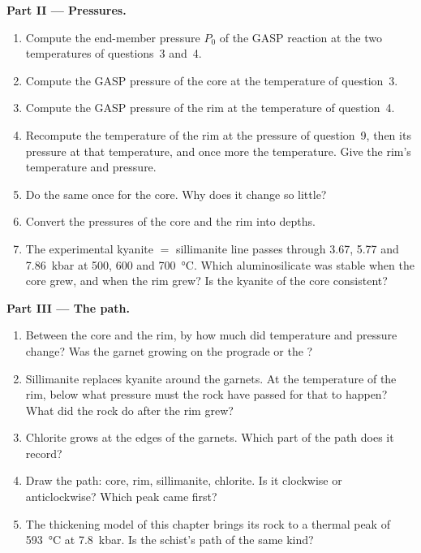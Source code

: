 \begin{problem}
\noindent\textbf{Part II --- Pressures.}
\begin{enumerate}[resume]
\item Compute the end-member pressure $P_0$ of the GASP reaction at the two temperatures
of questions~3 and~4.
\item Compute the GASP pressure of the core at the temperature of question~3.
\item Compute the GASP pressure of the rim at the temperature of question~4.
\item Recompute the temperature of the rim at the pressure of question~9, then its
pressure at that temperature, and once more the temperature. Give the rim's temperature
and pressure.
\item Do the same once for the core. Why does it change so little?
\item Convert the pressures of the core and the rim into depths.
\item The experimental kyanite $=$ sillimanite line passes through 3.67, 5.77 and
\qty{7.86}{kbar} at 500, 600 and \qty{700}{\celsius}. Which aluminosilicate was stable
when the core grew, and when the rim grew? Is the kyanite of the core consistent?
\end{enumerate}

\noindent\textbf{Part III --- The path.}
\begin{enumerate}[resume]
\item Between the core and the rim, by how much did temperature and pressure change?
Was the garnet growing on the prograde or the ?
\item Sillimanite replaces kyanite around the garnets. At the temperature of the rim,
below what pressure must the rock have passed for that to happen? What did the rock do
after the rim grew?
\item Chlorite grows at the edges of the garnets. Which part of the path does it record?
\item Draw the path: core, rim, sillimanite, chlorite. Is it clockwise or anticlockwise?
Which peak came first?
\item The thickening model of this chapter brings its rock to a thermal peak of
\qty{593}{\celsius} at \qty{7.8}{kbar}. Is the schist's path of the same kind?
\end{enumerate}


\end{problem}
